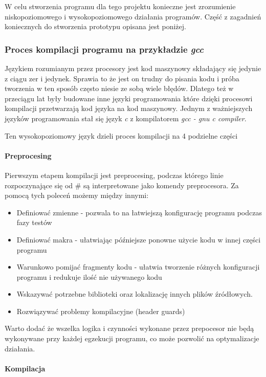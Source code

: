 \documentclass[a4paper,12pt]{article}
\begin{document}
W celu stworzenia programu dla tego projektu konieczne jest zrozumienie niskopoziomowego i wysokopoziomowego działania programów. Część z zagadnień koniecznych do stworzenia prototypu opisana jest poniżej. 

\subsubsection{Proces kompilacji programu na przykładzie \textit{gcc}\cite{gcc}}

Językiem rozumianym przez procesory jest kod maszynowy składający się jedynie z ciągu zer i jedynek.
Sprawia to że jest on trudny do pisania kodu i próba tworzenia w ten sposób często niesie ze sobą wiele błędów. 
Dlatego też w przeciągu lat były budowane inne języki programowania które dzięki procesowi kompilacji przetwarzają kod języka na kod maszynowy. 
Jednym z ważniejszych języków programowania stał się język \textit{c} z kompilatorem \textit{gcc - gnu c compiler}. 

Ten wysokopoziomowy język dzieli proces kompilacji na 4 podzielne części

\paragraph{Preprocesing}

Pierwszym etapem kompilacji jest preprocesing, podczas którego linie rozpoczynające się od \# są interpretowane jako komendy preprocesora.  
Za pomocą tych poleceń możemy między innymi:
\begin{itemize}
        \item Definiować zmienne - pozwala to na łatwiejszą konfigurację programu podczas fazy testów
        \item Definiować makra - ułatwiając późniejsze ponowne użycie kodu w innej części programu
        \item Warunkowo pomijać fragmenty kodu - ułatwia tworzenie różnych konfiguracji programu i redukuje ilość nie używanego kodu
        \item Wskazywać potrzebne biblioteki oraz lokalizację innych plików źródłowych.
        \item Rozwiązywać problemy kompilacyjne (header guards)
\end{itemize}
Warto dodać że wszelka logika i czynności wykonane przez prepocesor nie będą wykonywane przy każdej egzekucji programu, co może pozwolić na optymalizacje działania. 

\paragraph{Kompilacja}
\end{document}
